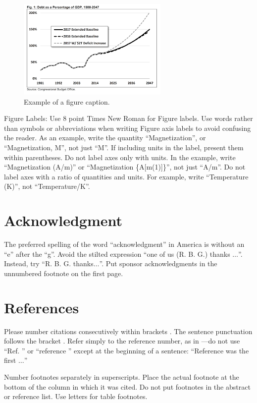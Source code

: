 \documentclass[conference]{IEEEtran}
\begin{document}
\begin{figure}[htbp]
\centerline{\includegraphics{fig1.png}}
\caption{Example of a figure caption.}
\label{fig}
\end{figure}

Figure Labels: Use 8 point Times New Roman for Figure labels. Use words 
rather than symbols or abbreviations when writing Figure axis labels to 
avoid confusing the reader. As an example, write the quantity 
``Magnetization'', or ``Magnetization, M'', not just ``M''. If including 
units in the label, present them within parentheses. Do not label axes only 
with units. In the example, write ``Magnetization (A/m)'' or ``Magnetization 
\{A[m(1)]\}'', not just ``A/m''. Do not label axes with a ratio of 
quantities and units. For example, write ``Temperature (K)'', not 
``Temperature/K''.

\section*{Acknowledgment}

The preferred spelling of the word ``acknowledgment'' in America is without 
an ``e'' after the ``g''. Avoid the stilted expression ``one of us (R. B. 
G.) thanks $\ldots$''. Instead, try ``R. B. G. thanks$\ldots$''. Put sponsor 
acknowledgments in the unnumbered footnote on the first page.

\section*{References}

Please number citations consecutively within brackets \cite{b1}. The 
sentence punctuation follows the bracket \cite{b2}. Refer simply to the reference 
number, as in \cite{b3}---do not use ``Ref. \cite{b3}'' or ``reference \cite{b3}'' except at 
the beginning of a sentence: ``Reference \cite{b3} was the first $\ldots$''

Number footnotes separately in superscripts. Place the actual footnote at 
the bottom of the column in which it was cited. Do not put footnotes in the 
abstract or reference list. Use letters for table footnotes.
\end{document}
